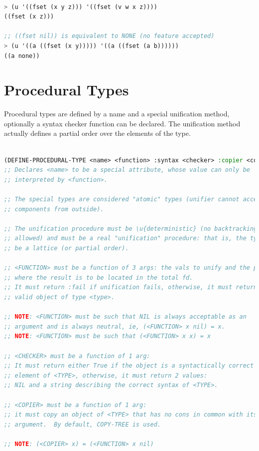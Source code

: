 \documentclass[10pt,a4paper]{report}
\begin{document}
\begin{lstlisting}[language=Lisp]

> (u '((fset (x y z))) '((fset (v w x z))))
((fset (x z)))

;; ((fset nil)) is equivalent to NONE (no feature accepted)
> (u '((a ((fset (x y))))) '((a ((fset (a b))))))
((a none))

\end{lstlisting}


\section{Procedural Types}
\label{procedural-type}


Procedural types are defined by a name and a special unification method,
optionally a syntax checker function can be declared.  The unification
method actually defines a partial order over the elements of the type.  

\begin{lstlisting}[language=Lisp]

(DEFINE-PROCEDURAL-TYPE <name> <function> :syntax <checker> :copier <copier>)
;; Declares <name> to be a special attribute, whose value can only be
;; interpreted by <function>. 

;; The special types are considered "atomic" types (unifier cannot access to
;; components from outside).

;; The unification procedure must be \u{deterministic} (no backtracking
;; allowed) and must be a real "unification" procedure: that is, the type must
;; be a lattice (or partial order).

;; <FUNCTION> must be a function of 3 args: the vals to unify and the path
;; where the result is to be located in the total fd.
;; It must return :fail if unification fails, otherwise, it must return a
;; valid object of type <type>.

;; NOTE: <FUNCTION> must be such that NIL is always acceptable as an
;; argument and is always neutral, ie, (<FUNCTION> x nil) = x.
;; NOTE: <FUNCTION> must be such that (<FUNCTION> x x) = x

;; <CHECKER> must be a function of 1 arg: 
;; It must return either True if the object is a syntactically correct
;; element of <TYPE>, otherwise, it must return 2 values:
;; NIL and a string describing the correct syntax of <TYPE>.

;; <COPIER> must be a function of 1 arg:
;; it must copy an object of <TYPE> that has no cons in common with its
;; argument.  By default, COPY-TREE is used.

;; NOTE: (<COPIER> x) = (<FUNCTION> x nil)

\end{lstlisting}
\end{document}
